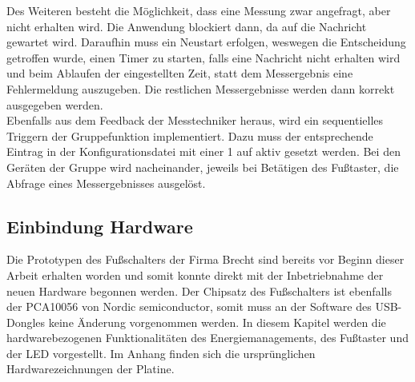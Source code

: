 Des Weiteren besteht die Möglichkeit, dass eine Messung zwar angefragt, aber nicht erhalten wird. Die Anwendung blockiert dann, da auf die Nachricht gewartet wird. Daraufhin muss ein Neustart erfolgen, weswegen die Entscheidung getroffen wurde, einen Timer zu starten, falls eine Nachricht nicht erhalten wird und beim Ablaufen der eingestellten Zeit, statt dem Messergebnis eine Fehlermeldung auszugeben. Die restlichen Messergebnisse werden dann korrekt ausgegeben werden.\\
Ebenfalls aus dem Feedback der Messtechniker heraus, wird ein sequentielles Triggern der Gruppefunktion implementiert. Dazu muss der entsprechende Eintrag in der Konfigurationsdatei mit einer 1 auf aktiv gesetzt werden. Bei den Geräten der Gruppe wird nacheinander, jeweils bei Betätigen des Fußtaster, die Abfrage eines Messergebnisses ausgelöst.

\subsection{Einbindung Hardware}
\label{EinbindungHardware}
Die Prototypen des Fußschalters der Firma Brecht sind bereits vor Beginn dieser Arbeit erhalten worden und somit konnte direkt mit der Inbetriebnahme der neuen Hardware begonnen werden. Der Chipsatz des Fußschalters ist ebenfalls der PCA10056 von Nordic semiconductor, somit muss an der Software des \ac{USB}-Dongles keine Änderung vorgenommen werden. In diesem Kapitel werden die hardwarebezogenen Funktionalitäten des Energiemanagements, des Fußtaster und der \ac{LED} vorgestellt. Im Anhang finden sich die ursprünglichen Hardwarezeichnungen der Platine.


